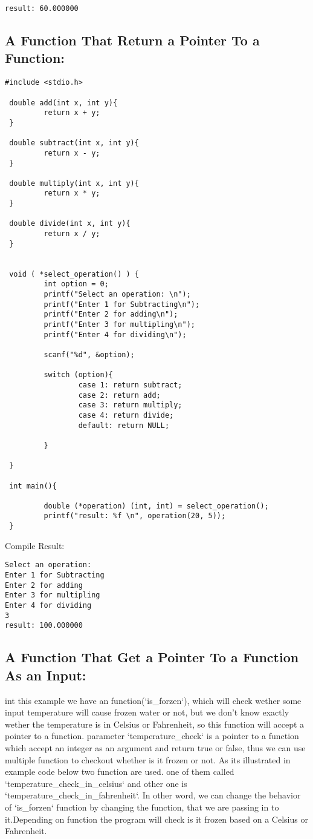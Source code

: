 \begin{lstlisting} 
result: 60.000000
\end{lstlisting}

\subsection{A Function That Return a Pointer To a Function:}
\begin{lstlisting} 
#include <stdio.h>

 double add(int x, int y){
         return x + y;
 }

 double subtract(int x, int y){
         return x - y;
 }

 double multiply(int x, int y){
         return x * y;
 }

 double divide(int x, int y){
         return x / y;
 }


 void ( *select_operation() ) {
         int option = 0;
         printf("Select an operation: \n");
         printf("Enter 1 for Subtracting\n");
         printf("Enter 2 for adding\n");
         printf("Enter 3 for multipling\n");
         printf("Enter 4 for dividing\n");

         scanf("%d", &option);

         switch (option){
                 case 1: return subtract;
                 case 2: return add;
                 case 3: return multiply;
                 case 4: return divide;
                 default: return NULL;

         }

 }

 int main(){

         double (*operation) (int, int) = select_operation();
         printf("result: %f \n", operation(20, 5));
 }
\end{lstlisting}
Compile Result:
\begin{lstlisting} 
Select an operation:
Enter 1 for Subtracting
Enter 2 for adding
Enter 3 for multipling
Enter 4 for dividing
3
result: 100.000000
\end{lstlisting}

\subsection{A Function That Get a Pointer To a Function As an Input:}
int this example we have an function(`is\_forzen`), which will check wether some input temperature
will cause frozen water or not, but we don't know exactly wether the temperature is in
Celsius or Fahrenheit, so this function will accept a pointer to a function.
parameter `temperature\_check` is a pointer to a function which accept an integer
as an argument and return true or false, thus we can use multiple function to checkout whether
is it frozen or not. As its illustrated in example code below two function are used. one of them
called `temperature\_check\_in\_celsius` and other one is `temperature\_check\_in\_fahrenheit`.  
In other word, we can change the behavior of `is\_forzen` function by changing the function, that we are 
passing in to it.Depending on function the program will check is it frozen based on a Celsius or
Fahrenheit. 
\newline

